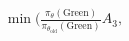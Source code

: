 \documentclass[preview]{standalone}
\begin{document}
\begin{align*}
\min \big(\frac{\pi_\theta(\text{Green})}{\pi_{\theta_{\text{old}}}(\text{Green})} A_3,
\end{align*}
\end{document}
